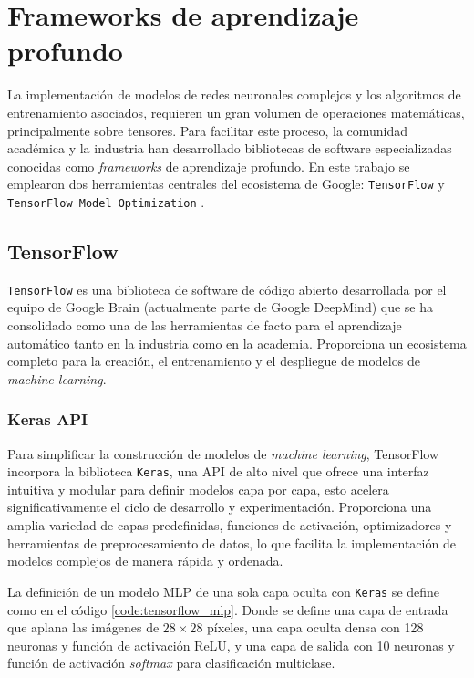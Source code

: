 

\section{Frameworks de aprendizaje profundo}

La implementación de modelos de redes neuronales complejos y los algoritmos de entrenamiento asociados, requieren un gran volumen de operaciones matemáticas, principalmente sobre tensores. Para facilitar este proceso, la comunidad académica y la industria han desarrollado bibliotecas de software especializadas conocidas como \textit{frameworks} de aprendizaje profundo. En este trabajo se emplearon dos herramientas centrales del ecosistema de Google: \texttt{TensorFlow} \cite{tensorflow} y \texttt{TensorFlow Model Optimization} \cite{tensorflow-model-optimization}.

\subsection{TensorFlow}

\texttt{TensorFlow} es una biblioteca de software de código abierto desarrollada por el equipo de Google Brain (actualmente parte de Google DeepMind) que se ha consolidado como una de las herramientas de facto para el aprendizaje automático tanto en la industria como en la academia. Proporciona un ecosistema completo para la creación, el entrenamiento y el despliegue de modelos de \textit{machine learning}.

\subsubsection{Keras API}
\label{sec:keras}
Para simplificar la construcción de modelos de \textit{machine learning}, TensorFlow incorpora la biblioteca \texttt{Keras}, una API de alto nivel que ofrece una interfaz intuitiva y modular para definir modelos capa por capa, esto acelera significativamente el ciclo de desarrollo y experimentación. Proporciona una amplia variedad de capas predefinidas, funciones de activación, optimizadores y herramientas de preprocesamiento de datos, lo que facilita la implementación de modelos complejos de manera rápida y ordenada.

La definición de un modelo \cite{tensorflow_keras_model} MLP de una sola capa oculta con \texttt{Keras} se define como en el código \ref{code:tensorflow_mlp}. Donde se define una capa de entrada que aplana las imágenes de $28 \times 28$ píxeles, una capa oculta densa con 128 neuronas y función de activación ReLU, y una capa de salida con 10 neuronas y función de activación \textit{softmax} para clasificación multiclase.

